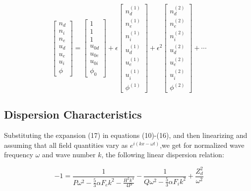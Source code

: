 \documentclass[journal]{IEEEtran}
\begin{document}
	
		\begin{equation}
			\renewcommand{\arraystretch}{1.5}
			\begin{bmatrix}
				n_d	\\ n_i \\ n_e \\ u_d \\ u_e \\ u_i \\ \phi
			\end{bmatrix} 
			= 
			\begin{bmatrix}
				1 \\ 1 \\ 1 \\ u_{0d} \\ u_{0e} \\u_{0i} \\ \phi_0 
			\end{bmatrix}
			+ \epsilon
			\begin{bmatrix}
				n_d^{(1)} \\ n_e^{(1)} \\ n_i^{(1)} \\ u_d^{(1)} \\ u_e^{(1)} \\ u_i^{(1)} \\ \phi^{(1)}   	
			\end{bmatrix}
			+ \epsilon^2
			\begin{bmatrix}
				n_d^{(2)} \\ n_e^{(2)} \\ n_i^{(2)} \\ u_d^{(2)} \\ u_e^{(2)} \\ u_i^{(2)} \\ \phi^{(2)}   	
			\end{bmatrix}
			+\cdots
		\end{equation}

	\subsection{Dispersion Characteristics}

		Substituting the expansion (17) in equations (10)-(16), and then linearizing and assuming that all field quantities vary as $e^{i(kx-\omega t)}$,we get for normalized wave frequency $\omega$ and wave number $k$, the following linear dispersion relation:
	
		\begin{equation}
			 -1 = \frac{1}{P\omega^2 - \frac{5}{3}\alpha F_e k^2 - \frac{H^2k^4}{4P}} - \frac{1}{Q\omega^2 - \frac{5}{3}\alpha F_ik^2}  + \frac{Z_d^2}{\omega^2}
		\end{equation}
	
\end{document}
